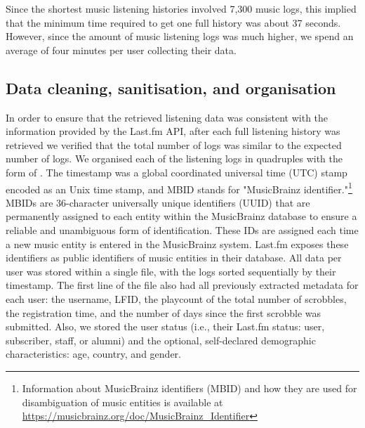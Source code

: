 Since the shortest music listening histories involved 7,300 music logs, this implied that the minimum time required to get one full history was about 37 seconds. However, since the amount of music listening logs was much higher, we spend an average of four minutes per user collecting their data.
\subsection{Data cleaning, sanitisation, and organisation}\label{sub:cleaning}
In order to ensure that the retrieved listening data was consistent with the information provided by the Last.fm API, after each full listening history was retrieved we verified that the total number of logs was similar to the expected number of logs. We organised each of the listening logs in quadruples with the form of {\tt <timestamp, artist-MBID, album-MBID, track-MBID>}. The ti\-mestamp was a global coordinated universal time (UTC) stamp encoded as an Unix time stamp, and MBID stands for "MusicBrainz identifier."\footnote{Information about MusicBrainz identifiers (MBID) and how they are used for disambiguation of music entities is available at \url{https://musicbrainz.org/doc/MusicBrainz_Identifier}} MBIDs are 36-character universally unique identifiers (UUID) that are permanently assigned to each entity within the MusicBrainz database to ensure a reliable and unambiguous form of identification. These IDs are assigned each time a new music entity is entered in the MusicBrainz system. 
Last.fm exposes these identifiers as public identifiers of music entities in their database. 
All data per user was stored within a single file, with the logs sorted sequentially by their timestamp. The first line of the file also had all previously extracted metadata for each user: 
the username, LFID, the playcount of the total number of scrobbles, the registration time, and the number of days since the first scrobble was submitted. Also, we stored the user status (i.e., their Last.fm status: user, subscriber, staff, or alumni) and the optional, self-declared demographic characteristics: age, country, and gender.


